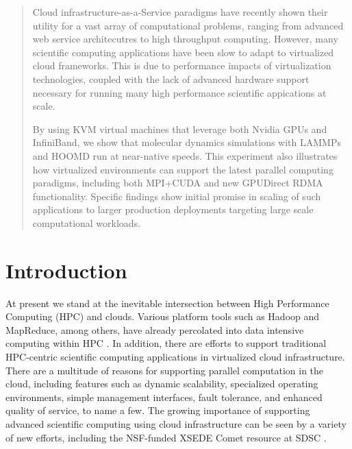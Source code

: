 \documentclass[times,10pt,twocolumn,conference]{IEEEtran}
\begin{document}
\begin{abstract}

Cloud infrastructure-as-a-Service paradigms have recently shown their utility for a vast array of computational problems, ranging from advanced web service architecutres to high throughput computing.  However, many scientific computing applications have been slow to adapt to virtualized cloud frameworks. This is due to performance impacts of virtualization technologies, coupled with the lack of advanced hardware support necessary for running many high performance scientific appications at scale. 

By using KVM virtual machines that leverage both Nvidia GPUs and InfiniBand, we show that molecular dynamics simulations with LAMMPs and HOOMD run at near-native speeds. This experiment also illustrates how virtualized environments can support the latest parallel computing paradigms, including both MPI+CUDA and new GPUDirect RDMA functionality. Specific findings show initial promise in scaling of such applications to larger production deployments targeting large scale computational workloads.  


 



\end{abstract}

\section{Introduction}

At present we stand at the inevitable intersection between High Performance Computing (HPC) and clouds. Various platform tools such as Hadoop and MapReduce, among others, have already percolated into data intensive computing within HPC \cite{jha2014apache}.  In addition, there are efforts to support traditional HPC-centric scientific computing applications in virtualized cloud infrastructure.  There are a multitude of reasons for supporting parallel computation in the cloud\cite{Armbrust2010}, including features such as dynamic scalability, specialized operating environments, simple management interfaces, fault tolerance, and enhanced quality of service, to name a few. The growing importance of supporting advanced scientific computing using cloud infrastructure can be seen by a variety of new efforts, including the NSF-funded XSEDE Comet resource at SDSC \cite{sdsc2014comet}.  
\end{document}
